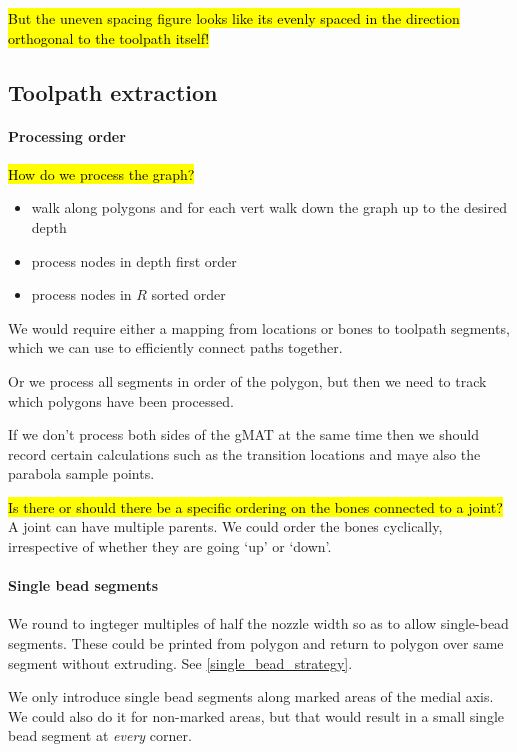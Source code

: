 \hl{But the uneven spacing figure looks like its evenly spaced in the direction orthogonal to the toolpath itself!}




\subsection{Toolpath extraction}
\paragraph{Processing order}
\hl{How do we process the graph?}
\begin{itemize}
\item walk along polygons and for each vert walk down the graph up to the desired depth
\item process nodes in depth first order
\item process nodes in $R$ sorted order
\end{itemize}

We would require either a mapping from locations or bones to toolpath segments, which we can use to efficiently connect paths together.

Or we process all segments in order of the polygon, but then we need to track which polygons have been processed.

If we don't process both sides of the gMAT at the same time then we should record certain calculations such as the transition locations and maye also the parabola sample points.

\hl{Is there or should there be a specific ordering on the bones connected to a joint?}
A joint can have multiple parents.
We could order the bones cyclically, irrespective of whether they are going `up' or `down'.




\paragraph{Single bead segments}
We round to ingteger multiples of half the nozzle width so as to allow single-bead segments.
These could be printed from polygon and return to polygon over same segment without extruding.
See \cref{single_bead_strategy}.

We only introduce single bead segments along marked areas of the medial axis.
We could also do it for non-marked areas, but that would result in a small single bead segment at \emph{every} corner.


